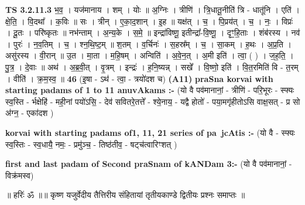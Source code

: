 \documentclass[17pt]{extarticle}
\begin{document}
                  \newline
                                \textbf{ TS 3.2.11.3} \newline
                  भ॒व॒ । यज॑मानाय । शम् । योः ॥ अ॒ग्निः । त्रीणि॑ । त्रि॒धातू॒नीति॑ त्रि - धातू॑नि । एति॑ । क्षे॒ति॒ । वि॒दथा᳚ । क॒विः ॥ सः । त्रीन् । ए॒का॒द॒शान् । इ॒ह ॥ यक्ष॑त् । च॒ । पि॒प्रय॑त् । च॒ । नः॒ । विप्रः॑ । दू॒तः । परि॑ष्कृतः ॥ नभ॑न्ताम् । अ॒न्य॒के । स॒मे॒ ॥ इन्द्रा॑विष्णू॒ इतीन्द्रा᳚-वि॒ष्णू॒ । दृꣳ॒॒हि॒ताः । शंब॑रस्य । नव॑ । पुरः॑ । न॒व॒तिम् । च॒ । श्न॒थि॒ष्ट॒म् ॥ श॒तम् । व॒र्चिनः॑ । स॒हस्र᳚म् । च॒ । सा॒कम् । ह॒थः । अ॒प्र॒ति । असु॑रस्य । वी॒रान् ॥ उ॒त । मा॒ता । म॒हि॒षम् । अन्विति॑ । अ॒वे॒न॒त् । अ॒मी इति॑ । त्वा॒ ( ) । ज॒ह॒ति॒ । पु॒त्र॒ । दे॒वाः ॥ अथ॑ । अ॒ब्र॒वी॒त् । वृ॒त्रम् । इन्द्रः॑ । ह॒नि॒ष्यन्न् । सखे᳚ । वि॒ष्णो॒ इति॑ । वि॒त॒रमिति॑ वि - त॒रम् । वीति॑ । क्र॒म॒स्व॒ ॥ \textbf{  46} \newline
                  \newline
                      (इ॒षा - ऽथ॑ - त्वा॒ - त्रयो॑दश च)  \textbf{(A11)} \newline \newline
\textbf{praSna korvai with starting padams of 1 to 11 anuvAkams :-} \newline
(यो वै पव॑मानानां॒ - त्रीणि॑ - परि॒भूरः - स्फ्यः स्व॒स्ति - र्भक्षेहि॑ - मही॒नां पयो॑ऽसि॒ - देव॑ सवितरे॒तत्ते᳚ - श्ये॒नाय॒ - यद्वै होतो॑ - पया॒मगृ॑हीतोऽसि वाक्ष॒सत् - प्र सो अ॑ग्न॒ - एका॑दश ) \newline

\textbf{korvai with starting padams of1, 11, 21 series of pa~jcAtis :-} \newline
(यो वै - स्फ्यः स्व॒स्तिः - स्व॒धायै॒ नमः॒ - प्रमु॑ञ्च॒ - तिष्ठ॑तीव॒ - षट्च॑त्वारिꣳशत् ) \newline

\textbf{first and last padam of Second praSnam of kANDam 3:-} \newline
(यो वै पव॑मानानां॒ - विक्र॑मस्व) \newline 


॥ हरिः॑ ॐ ॥॥ कृष्ण यजुर्वेदीय तैत्तिरीय संहितायां तृतीयकाण्डे द्वितीयः प्रश्नः समाप्तः ॥ \newline
\pagebreak
\pagebreak
        
\end{document}
